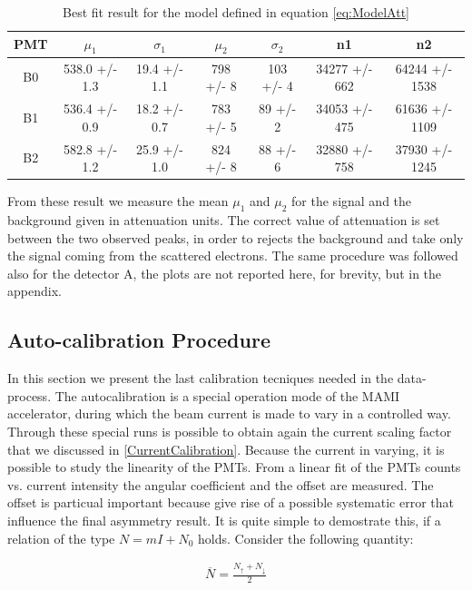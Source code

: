 \begin{table}
\centering
\begin{tabular}{c|c|c|c|c|c|c}
\hline
 PMT   &  $\mu_{1}$         &  $\sigma_{1}$         & $\mu_{2}$          & $\sigma_{2}$   & n1                & n2                 \\
\hline
 B0    & 538.0 +/- 1.3 & 19.4 +/- 1.1 & 798 +/- 8 & 103 +/- 4 & 34277 +/- 662 & 64244 +/- 1538 \\
 B1    & 536.4 +/- 0.9 & 18.2 +/- 0.7 & 783 +/- 5 & 89 +/- 2  & 34053 +/- 475 & 61636 +/- 1109 \\
 B2    & 582.8 +/- 1.2 & 25.9 +/- 1.0 & 824 +/- 8 & 88 +/- 6  & 32880 +/- 758 & 37930 +/- 1245 \\
\hline
\end{tabular}
\caption{Best fit result for the model defined in equation \ref{eq:ModelAtt}}
\end{table}

From these result we measure the mean $\mu_{1}$ and $\mu_{2}$ for the signal and the background given in attenuation units. The correct value of attenuation is set between the two observed peaks, in order to rejects the background and take only the signal coming from the scattered electrons. The same procedure was followed also for the detector A, the plots are not reported here, for brevity, but in the appendix.

\subsection{Auto-calibration Procedure} \label{Autocalib}

In this section we present the last calibration tecniques needed in the data-process. The autocalibration is a special operation mode of the MAMI accelerator, during which the beam current is made to vary in a controlled way. Through these special runs is possible to obtain again the current scaling factor that we discussed in \ref{CurrentCalibration}. Because the current in varying, it is possible to study the linearity of the PMTs. From a linear fit of the PMTs counts vs. current intensity the angular coefficient and the offset are measured. The offset is particual important because give rise of a possible systematic error that influence the final asymmetry result. It is quite simple to demostrate this, if a relation of the type $N = mI + N_{0} $ holds. Consider the following quantity:

\begin{align*}
\overline{N} = \frac{N_{\uparrow} + N_{\downarrow}}{2}
\end{align*} 

